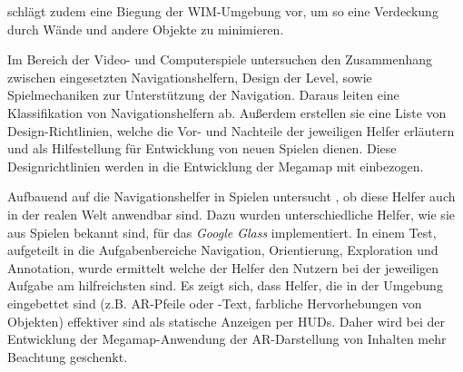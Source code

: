 \textcite{Vallance2001} schlägt zudem eine Biegung der \gls{WIM}-Umgebung vor, um so eine Verdeckung durch Wände und andere Objekte zu minimieren.

Im Bereich der Video- und Computerspiele untersuchen \textcites{Moura2014}{Moura2015} den Zusammenhang zwischen eingesetzten Navigationshelfern, Design der Level, sowie Spielmechaniken zur Unterstützung der Navigation.
Daraus leiten \textcite{Moura2015} eine Klassifikation von Navigationshelfern ab.
Außerdem erstellen sie eine Liste von Design-Richtlinien, welche die Vor- und Nachteile der jeweiligen Helfer erläutern und als Hilfestellung für Entwicklung von neuen Spielen dienen.
Diese Designrichtlinien werden in die Entwicklung der Megamap mit einbezogen.

Aufbauend auf die Navigationshelfer in Spielen untersucht \textcite{Lodts2015}, ob diese Helfer auch in der realen Welt anwendbar sind.
Dazu wurden unterschiedliche Helfer, wie sie aus Spielen bekannt sind, für das \emph{Google Glass} implementiert.
In einem Test, aufgeteilt in die Aufgabenbereiche Navigation, Orientierung, Exploration und Annotation, wurde ermittelt welche der Helfer den Nutzern bei der jeweiligen Aufgabe am hilfreichsten sind.
Es zeigt sich, dass Helfer, die in der Umgebung eingebettet sind (z.B. \gls{AR}-Pfeile oder -Text, farbliche Hervorhebungen von Objekten) effektiver sind als statische Anzeigen per \glspl{HUD}.
Daher wird bei der Entwicklung der Megamap-Anwendung der \gls{AR}-Darstellung von Inhalten mehr Beachtung geschenkt.
%
\cleardoublepage